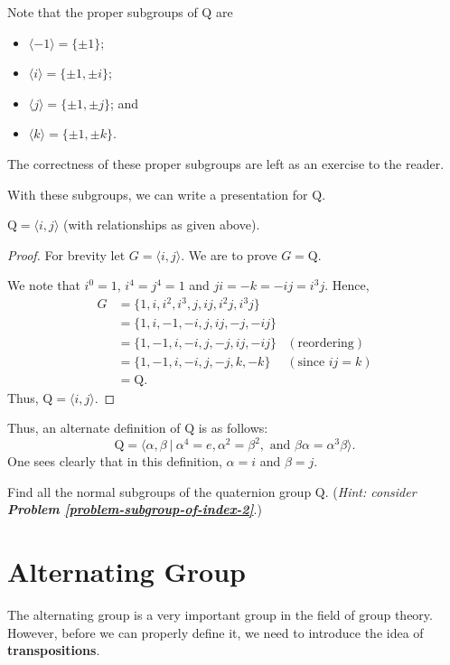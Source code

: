 Note that the proper subgroups of $\mathrm{Q}$ are
\begin{itemize}
    \item $\langle -1 \rangle = \{\pm1\}$;
    \item $\langle i \rangle = \{\pm1, \pm i\}$;
    \item $\langle j \rangle = \{\pm1, \pm j\}$; and
    \item $\langle k \rangle = \{\pm1, \pm k\}$.
\end{itemize}
The correctness of these proper subgroups are left as an exercise to the reader.

With these subgroups, we can write a presentation for $\mathrm{Q}$.

\begin{proposition}
    $\mathrm{Q} = \langle i, j \rangle$ (with relationships as given above).
\end{proposition}
\begin{proof}
    For brevity let $G = \langle i, j \rangle$. We are to prove $G = \mathrm{Q}$.

    We note that $i^0 = 1$, $i^4 = j^4 = 1$ and $ji = -k = -ij = i^3j$. Hence,
    \begin{align*}
        G &= \{1, i, i^2, i^3, j, ij, i^2j, i^3j\}\\
        &= \{1, i, -1, -i, j, ij, -j, -ij\}\\
        &= \{1, -1, i, -i, j, -j, ij, -ij\} & (\text{reordering})\\
        &= \{1, -1, i, -i, j, -j, k, -k\} & (\text{since } ij = k)\\
        &= \mathrm{Q}.
    \end{align*}
    Thus, $\mathrm{Q} = \langle i, j \rangle$.
\end{proof}

Thus, an alternate definition of $\mathrm{Q}$ is as follows:
\[
    \mathrm{Q} = \langle \alpha, \beta \ | \ \alpha^4 = e, \alpha^2 = \beta^2, \text{ and } \beta\alpha = \alpha^3\beta \rangle.
\]
One sees clearly that in this definition, $\alpha = i$ and $\beta = j$.

\begin{exercise}\label{exercise-normal-subgroups-of-quarternion-group}
    Find all the normal subgroups of the quaternion group $\mathrm{Q}$.\newline
    (\textit{Hint: consider \textbf{Problem \ref{problem-subgroup-of-index-2}}}.)
\end{exercise}

\section{Alternating Group}
The alternating group is a very important group in the field of group theory. However, before we can properly define it, we need to introduce the idea of \textbf{transpositions}.

